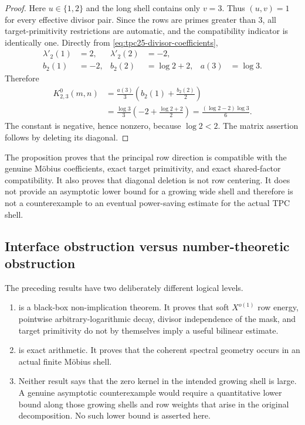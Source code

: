 \begin{proof}
Here \(u\in\{1,2\}\) and the long shell contains only \(v=3\).
Thus \((u,v)=1\) for every effective divisor pair.  Since the rows are
primes greater than \(3\), all target-primitivity restrictions are
automatic, and the compatibility indicator is identically one.
Directly from \eqref{eq:tpc25-divisor-coefficients},
\begin{align*}
 \lambda'_2(1)&=2,
 &\lambda'_2(2)&=-2,\\
 b_2(1)&=-2,
 &b_2(2)&=\log2+2,
 &a(3)&=\log3.
\end{align*}
Therefore
\begin{align*}
 K^0_{2,3}(m,n)
 &=\frac{a(3)}3
 \left(b_2(1)+\frac{b_2(2)}2\right)\\
 &=\frac{\log3}{3}
 \left(-2+\frac{\log2+2}{2}\right)
 =\frac{(\log2-2)\log3}{6}.
\end{align*}
The constant is negative, hence nonzero, because \(\log2<2\).  The
matrix assertion follows by deleting its diagonal.
\end{proof}

\begin{remark}
\label{rem:tpc25-finite-certificate-scope}
The proposition proves that the principal row direction is compatible
with the genuine M\"obius coefficients, exact target primitivity, and
exact shared-factor compatibility.  It also proves that diagonal
deletion is not row centering.  It does not provide an asymptotic lower
bound for a growing wide shell and therefore is not a counterexample to
an eventual power-saving estimate for the actual TPC shell.
\end{remark}

\subsection{Interface obstruction versus number-theoretic obstruction}

The preceding results have two deliberately different logical levels.

\begin{enumerate}[label=\textup{(\roman*)}]
 \item {} is a black-box
 non-implication theorem.  It proves that soft \(X^{o(1)}\) row energy,
 pointwise arbitrary-logarithmic decay, divisor independence of the
 mask, and target primitivity do not by themselves imply a useful
 bilinear estimate.
 \item {} is exact arithmetic.  It
 proves that the coherent spectral geometry occurs in an actual finite
 M\"obius shell.
 \item Neither result says that the zero kernel in the intended growing
 shell is large.  A genuine asymptotic counterexample would require a
 quantitative lower bound along those growing shells and row weights
 that arise in the original decomposition.  No such lower bound is
 asserted here.
\end{enumerate}

